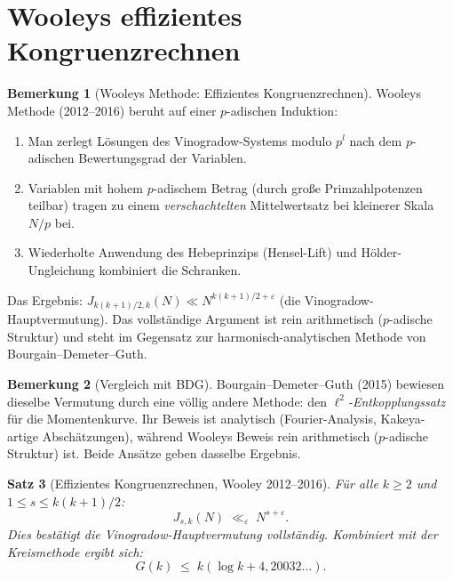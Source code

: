 \documentclass[12pt,a4paper]{amsart}
\newtheorem{theorem}{Satz}[section]
\theoremstyle{definition}
\newtheorem{bemerkung}[theorem]{Bemerkung}
\begin{document}
\section{Wooleys effizientes Kongruenzrechnen}
\label{sec:effizient}

\begin{bemerkung}[Wooleys Methode: Effizientes Kongruenzrechnen]
  Wooleys Methode (2012--2016) beruht auf einer $p$-adischen Induktion:
  \begin{enumerate}
    \item Man zerlegt Lösungen des Vinogradow-Systems modulo $p^l$ nach
      dem $p$-adischen Bewertungsgrad der Variablen.
    \item Variablen mit hohem $p$-adischem Betrag (durch große
      Primzahlpotenzen teilbar) tragen zu einem \emph{verschachtelten}
      Mittelwertsatz bei kleinerer Skala $N/p$ bei.
    \item Wiederholte Anwendung des Hebeprinzips (Hensel-Lift) und
      H\"older-Ungleichung kombiniert die Schranken.
  \end{enumerate}
  Das Ergebnis: $J_{k(k+1)/2, k}(N) \ll N^{k(k+1)/2 + \varepsilon}$
  (die Vinogradow-Hauptvermutung).  Das vollständige Argument ist rein
  arithmetisch ($p$-adische Struktur) und steht im Gegensatz zur
  harmonisch-analytischen Methode von Bourgain--Demeter--Guth.
\end{bemerkung}

\begin{bemerkung}[Vergleich mit BDG]
  Bourgain--Demeter--Guth (2015) bewiesen dieselbe Vermutung durch eine
  völlig andere Methode: den \emph{$\ell^2$-Entkopplungssatz} für die
  Momentenkurve.  Ihr Beweis ist analytisch (Fourier-Analysis,
  Kakeya-artige Abschätzungen), während Wooleys Beweis rein arithmetisch
  ($p$-adische Struktur) ist.  Beide Ansätze geben dasselbe Ergebnis.
\end{bemerkung}

\begin{theorem}[Effizientes Kongruenzrechnen, Wooley 2012--2016]%
  \label{thm:effcong}
  Für alle $k \geq 2$ und $1 \leq s \leq k(k+1)/2$:
  \[
    J_{s,k}(N) \;\ll_\varepsilon\; N^{s+\varepsilon}.
  \]
  Dies bestätigt die Vinogradow-Hauptvermutung vollständig.
  Kombiniert mit der Kreismethode ergibt sich:
  \[
    G(k) \;\leq\; k\!\left(\log k + 4{,}20032\ldots\right).
  \]
\end{theorem}
\end{document}
